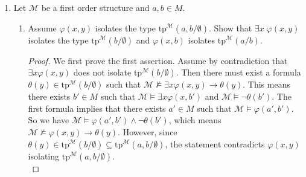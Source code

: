 \documentclass{article}
\begin{document}
\begin{enumerate}[label={\bf Q\arabic*:}]
\begin{proof}
      $\Leftarrow$: Assume $[p]=[q]$. By symmetry it suffices to show that
      $p\vdash q$. Let $\phi$ be a formula in $q$. We need to show that
      $p\vdash\phi$. Assume by contradiction that $p\not\vdash\phi$. Then
      $p\cup\{\neg\phi\}$ is consistent. Let $\mathcal{N}$ be an elementary
      extension of $\mathcal{M}$ that realizes $p\not\vdash\phi$; such
      $\mathcal{N}$ exists from Proposition 6.3. Let $p'\supseteq
      p\cup\{\neg\phi\}$ be the Completion of $p\cup\{\neg\phi\}$ by
      including all formulas over $A$ in $n$-variables that are true in
      $\mathcal{N}$. Then $p'\in[q]$ since $p'\in[p]$ and $[p]=[q]$, yet
      $p'$ contains both $\phi$ and $\neg\phi$, contradicting the
      consistency of $p'$.
    \end{proof}

  \item Let $\mathcal{M}$ be a first order structure and $a,b\in M$.
    \begin{enumerate}
      \item Assume $\varphi(x,y)$ isolates the type
        $\text{tp}^{\mathcal{M}}(a,b/\emptyset)$. Show that $\exists
        x\; \varphi(x,y)$ isolates the type
        $\text{tp}^{\mathcal{M}}(b/\emptyset)$ and $\varphi(x,b)$ isolates
        $\text{tp}^{\mathcal{M}}(a/b)$.

        \begin{proof}
          We first prove the first assertion. Assume by contradiction that
          $\exists x\varphi(x,y)$ does not isolate
          $\text{tp}^{\mathcal{M}}(b/\emptyset)$. Then there must exist a
          formula $\theta(y)\in\text{tp}^{\mathcal{M}}(b/\emptyset)$ such
          that $\mathcal{M}\not\models\exists x
          \varphi(x,y)\rightarrow\theta(y)$. This means there exists $b'\in
          M$ such that $\mathcal{M}\models\exists x\varphi(x,b')$ and
          $\mathcal{M}\models\neg\theta(b')$. The first formula implies
          that there exists $a'\in M$ such that
          $\mathcal{M}\models\varphi(a',b')$. So we have
          $\mathcal{M}\models\varphi(a',b')\wedge\neg\theta(b')$, which
          means $\mathcal{M}\not\models\varphi(x,y)\rightarrow\theta(y)$.
          However, since
          $\theta(y)\in\text{tp}^{\mathcal{M}}(b/\emptyset)\subseteq
          \text{tp}^{\mathcal{M}}(a,b/\emptyset)$, the statement
          contradicts $\varphi(x,y)$ isolating
          $\text{tp}^{\mathcal{M}}(a,b/\emptyset)$. \\


\end{proof}
\end{enumerate}
\end{enumerate}
\end{document}
